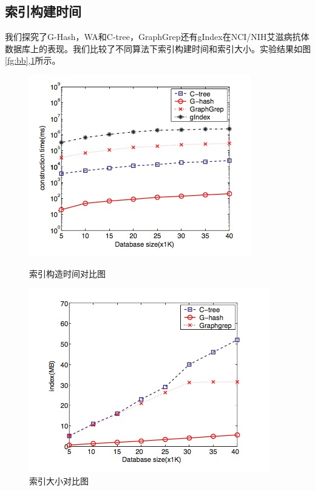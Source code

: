 \documentclass{article}
\begin{document}
\subsection{索引构建时间}
我们探究了G-Hash，WA和C-tree，GraphGrep还有gIndex在NCI/NIH艾滋病抗体数据库上的表现。我们比较了不同算法下索引构建时间和索引大小。实验结果如图\ref{fg:bb},\ref{fg:bi}所示。
\begin{figure}[htb]
    \centering
    \begin{minipage}[t]{0.5\textwidth}
        \centering
        \includegraphics[width=\textwidth]{it}
        \caption{索引构造时间对比图}
        \label{fg:bb}
    \end{minipage}%
    \begin{minipage}[t]{0.5\textwidth}
        \centering
        \includegraphics[width=\textwidth]{is}
        \caption{索引大小对比图}
        \label{fg:bi}
    \end{minipage}

\end{figure}
\end{document}
